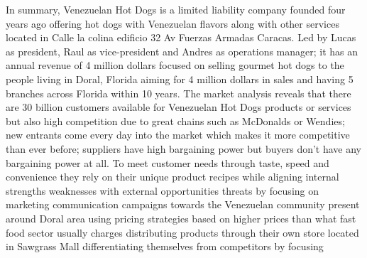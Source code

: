 In summary, Venezuelan Hot Dogs is a limited liability company founded four years ago offering hot dogs with Venezuelan flavors along with other services located in Calle la colina edificio 32 Av Fuerzas Armadas Caracas. Led by Lucas as president, Raul as vice-president and Andres as operations manager; it has an annual revenue of 4 million dollars focused on selling gourmet hot dogs to the people living in Doral, Florida aiming for 4 million dollars in sales and having 5 branches across Florida within 10 years. The market analysis reveals that there are 30 billion customers available for Venezuelan Hot Dogs products or services but also high competition due to great chains such as McDonalds or Wendies; new entrants come every day into the market which makes it more competitive than ever before; suppliers have high bargaining power but buyers don't have any bargaining power at all. To meet customer needs through taste, speed and convenience they rely on their unique product recipes while aligning internal strengths weaknesses with external opportunities threats by focusing on marketing communication campaigns towards the Venezuelan community present around Doral area using pricing strategies based on higher prices than what fast food sector usually charges distributing products through their own store located in Sawgrass Mall differentiating themselves from competitors by focusing